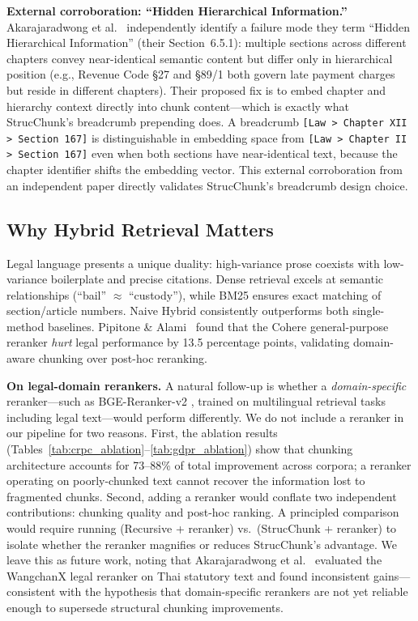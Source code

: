 \documentclass[sn-mathphys,Numbered]{sn-jnl}%
\begin{document}
\textbf{External corroboration: ``Hidden Hierarchical Information.''}
Akarajaradwong et al.~\cite{akarajaradwong2025nitibenchcomprehensivestudyllm} independently identify a failure mode
they term ``Hidden Hierarchical Information'' (their Section~6.5.1):
multiple sections across different chapters convey near-identical semantic
content but differ only in hierarchical position (e.g., Revenue Code
\S27 and \S89/1 both govern late payment charges but reside in different
chapters).  Their proposed fix is to embed chapter and hierarchy context
directly into chunk content---which is exactly what StrucChunk's breadcrumb
prepending does.  A breadcrumb \texttt{[Law > Chapter XII > Section 167]}
is distinguishable in embedding space from \texttt{[Law > Chapter II >
Section 167]} even when both sections have near-identical text, because the
chapter identifier shifts the embedding vector.  This external
corroboration from an independent paper directly validates StrucChunk's
breadcrumb design choice.

\subsection{Why Hybrid Retrieval Matters}

Legal language presents a unique duality: high-variance prose coexists
with low-variance boilerplate and precise citations.  Dense retrieval
excels at semantic relationships (``bail'' $\approx$ ``custody''), while
BM25 ensures exact matching of section/article numbers.  Naive Hybrid
consistently outperforms both single-method baselines.
Pipitone \& Alami~\cite{pipitone2024legalbenchragbenchmarkretrievalaugmentedgeneration} found that the Cohere general-purpose
reranker \emph{hurt} legal performance by 13.5 percentage points,
validating domain-aware chunking over post-hoc reranking.

\textbf{On legal-domain rerankers.}  A natural follow-up is whether a
\emph{domain-specific} reranker---such as BGE-Reranker-v2
\cite{chen-etal-2024-m3}, trained on multilingual retrieval tasks including
legal text---would perform differently.  We do not include a reranker in
our pipeline for two reasons.  First, the ablation results
(Tables~\ref{tab:crpc_ablation}--\ref{tab:gdpr_ablation}) show that
chunking architecture accounts for 73--88\% of total improvement across
corpora; a reranker operating on poorly-chunked text cannot recover the
information lost to fragmented chunks.  Second, adding a reranker would
conflate two independent contributions: chunking quality and post-hoc
ranking.  A principled comparison would require running (Recursive +
reranker) vs.\ (StrucChunk + reranker) to isolate whether the reranker
magnifies or reduces StrucChunk's advantage.  We leave this as future
work, noting that Akarajaradwong et al.~\cite{akarajaradwong2025nitibenchcomprehensivestudyllm} evaluated the
WangchanX legal reranker on Thai statutory text and found inconsistent
gains---consistent with the hypothesis that domain-specific rerankers are
not yet reliable enough to supersede structural chunking improvements.
\end{document}
